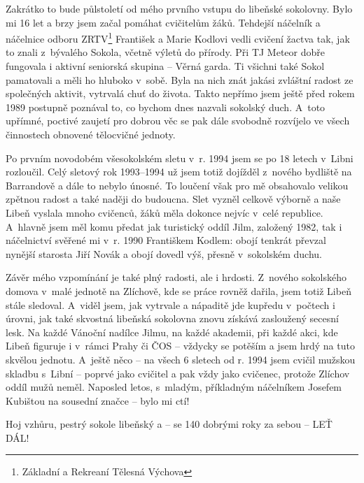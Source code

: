 \documentclass[11pt]{article}
\begin{document}
Zakrátko to bude půlstoletí od mého prvního vstupu do libeňské sokolovny. Bylo mi 16 let a brzy jsem začal pomáhat cvičitelům žáků. Tehdejší náčelník a náčelnice odboru ZRTV\footnote{Základní a Rekreaní Tělesná Výchova} František a Marie Kodlovi vedli cvičení žactva tak, jak to znali z~bývalého Sokola, včetně výletů do přírody. Při TJ Meteor dobře fungovala i aktivní seniorská skupina – Věrná garda. Ti všichni také Sokol pamatovali a měli ho hluboko v~sobě. Byla na nich znát jakási zvláštní radost ze společných aktivit, vytrvalá chuť do života. Takto nepřímo jsem ještě před rokem 1989 postupně poznával to, co bychom dnes nazvali sokolský duch. A~toto upřímné, poctivé zaujetí pro dobrou věc se pak dále svobodně rozvíjelo ve všech činnostech obnovené tělocvičné jednoty.

Po prvním novodobém všesokolském sletu v~r. 1994 jsem se po 18 letech v~Libni rozloučil. Celý sletový rok 1993–1994 už jsem totiž dojížděl z~nového bydliště na Barrandově a dále to nebylo únosné. To loučení však pro mě obsahovalo velikou zpětnou radost a také naději do budoucna. Slet vyzněl celkově výborně a naše Libeň vyslala mnoho cvičenců, žáků měla dokonce nejvíc v~celé republice. A~hlavně jsem měl komu předat jak turistický oddíl Jilm, založený 1982, tak i náčelnictví svěřené mi v~r. 1990 Františkem Kodlem: obojí tenkrát převzal nynější starosta Jiří Novák a obojí dovedl výš, přesně v~sokolském duchu.

Závěr mého vzpomínání je také plný radosti, ale i hrdosti. Z~nového sokolského domova v~malé jednotě na Zlíchově, kde se práce rovněž dařila, jsem totiž Libeň stále sledoval. A~viděl jsem, jak vytrvale a nápaditě jde kupředu v~počtech i úrovni, jak také skvostná libeňská sokolovna znovu získává zasloužený secesní lesk. Na každé Vánoční nadílce Jilmu, na každé akademii, při každé akci, kde Libeň figuruje i v~rámci Prahy či ČOS – vždycky se potěším a jsem hrdý na tuto skvělou jednotu. A~ještě něco – na všech 6 sletech od r. 1994 jsem cvičil mužskou skladbu s~Libní – poprvé jako cvičitel a pak vždy jako cvičenec, protože Zlíchov oddíl mužů neměl. Naposled letos, s~mladým, příkladným náčelníkem Josefem Kubištou na sousední značce – bylo mi ctí!

\vspace*{\baselineskip}
\noindent
Hoj vzhůru, pestrý sokole libeňský a – se 140 dobrými roky za sebou – LEŤ DÁL! 


\clearpage


\pagecolor{sokolred}
\color{white}
\renewcommand{\arraystretch}{1.2}
\end{document}
